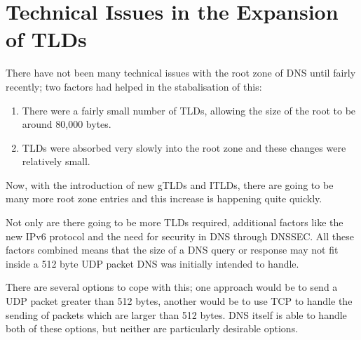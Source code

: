 \documentclass[11pt, a4paper]{article}
\begin{document}


\section{Technical Issues in the Expansion of TLDs}

There have not been many technical issues with the root zone of \gls{DNS} until
fairly recently; two factors had helped in the stabalisation of 
this\cite{manning2011challenges}:

\begin{enumerate}
\item There were a fairly small number of \glspl{TLD}, allowing the size of the
      root to be around 80,000 bytes.
\item \glspl{TLD} were absorbed very slowly into the root zone and these
      changes were relatively small.
\end{enumerate}

Now, with the introduction of new \glspl{gTLD} and \glspl{ITLD}, there are 
going to be many more root zone entries and this increase is happening quite
quickly.

Not only are there going to be more \glspl{TLD} required, additional factors
like the new IPv6 protocol and the need for security in \gls{DNS} through
\gls{DNSSEC}\cite{rfc2535}. All these factors combined means that the size of
a \gls{DNS} query or response may not fit inside a 512 byte \gls{UDP} packet
\gls{DNS} was initially intended to handle.

There are several options to cope with this; one approach would be to send a
\gls{UDP} packet greater than 512 bytes, another would be to use \gls{TCP} to
handle the sending of packets which are larger than 512 bytes. \gls{DNS} itself
is able to handle both of these options, but neither are particularly desirable
options.








\newpage


\end{document}
